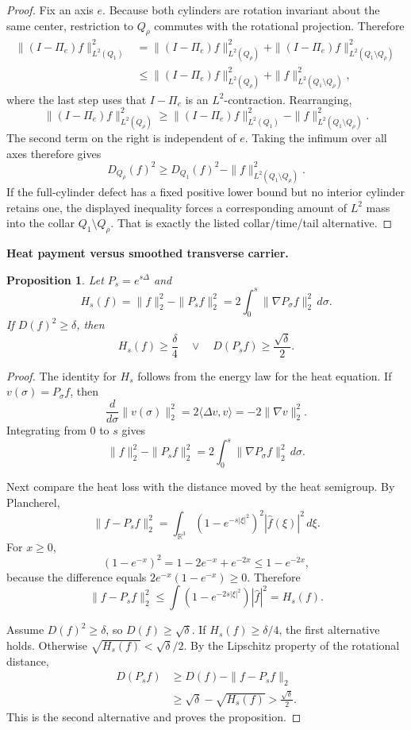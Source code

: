 \documentclass[11pt]{article}
\newtheorem{proposition}[theorem]{Proposition}
\theoremstyle{definition}\newtheorem{problem}[theorem]{Problem}
\theoremstyle{definition}
\theoremstyle{remark}
\newcommand{\R}{\mathbb R}
\begin{document}
\begin{proof}
Fix an axis \(e\).  Because both cylinders are rotation invariant about the
same center, restriction to \(Q_\rho\) commutes with the rotational projection.
Therefore
\[
\begin{aligned}
 \|(I-\Pi_e)f\|_{L^2(Q_1)}^2
 &=\|(I-\Pi_e)f\|_{L^2(Q_\rho)}^2
  +\|(I-\Pi_e)f\|_{L^2(Q_1\setminus Q_\rho)}^2\\
 &\le \|(I-\Pi_e)f\|_{L^2(Q_\rho)}^2
  +\|f\|_{L^2(Q_1\setminus Q_\rho)}^2,
\end{aligned}
\]
where the last step uses that \(I-\Pi_e\) is an \(L^2\)-contraction.  Rearranging,
\[
 \|(I-\Pi_e)f\|_{L^2(Q_\rho)}^2
 \ge
 \|(I-\Pi_e)f\|_{L^2(Q_1)}^2
 -\|f\|_{L^2(Q_1\setminus Q_\rho)}^2.
\]
The second term on the right is independent of \(e\).  Taking the infimum over
all axes therefore gives
\[
 D_{Q_\rho}(f)^2
 \ge D_{Q_1}(f)^2
 -\|f\|_{L^2(Q_1\setminus Q_\rho)}^2.
\]
If the full-cylinder defect has a fixed positive lower bound but no interior
cylinder retains one, the displayed inequality forces a corresponding amount
of \(L^2\) mass into the collar \(Q_1\setminus Q_\rho\).  That is exactly the
listed collar/time/tail alternative.
\end{proof}

\medskip
\noindent\textbf{Heat payment versus smoothed transverse carrier.}
\begin{proposition}
Let $P_s=e^{s\Delta}$ and
\[
 H_s(f)=\|f\|_2^2-\|P_sf\|_2^2
 =2\int_0^s\|\nabla P_\sigma f\|_2^2\,d\sigma.
\]
If $D(f)^2\ge\delta$, then
\[
 \boxed{
 H_s(f)\ge\frac\delta4
 \quad\vee\quad
 D(P_sf)\ge\frac{\sqrt\delta}{2}.
 }
\]
\end{proposition}

\begin{proof}
The identity for \(H_s\) follows from the energy law for the heat equation.  If
\(v(\sigma)=P_\sigma f\), then
\[
 \frac{d}{d\sigma}\|v(\sigma)\|_2^2
 =2\langle\Delta v,v\rangle
 =-2\|\nabla v\|_2^2.
\]
Integrating from \(0\) to \(s\) gives
\[
 \|f\|_2^2-\|P_sf\|_2^2
 =2\int_0^s\|\nabla P_\sigma f\|_2^2\,d\sigma.
\]

Next compare the heat loss with the distance moved by the heat semigroup.  By
Plancherel,
\[
 \|f-P_sf\|_2^2
 =\int_{\R^3}(1-e^{-s|\xi|^2})^2|\widehat f(\xi)|^2\,d\xi.
\]
For \(x\ge0\),
\[
 (1-e^{-x})^2
 =1-2e^{-x}+e^{-2x}
 \le1-e^{-2x},
\]
because the difference equals \(2e^{-x}(1-e^{-x})\ge0\).  Therefore
\[
 \|f-P_sf\|_2^2
 \le
 \int(1-e^{-2s|\xi|^2})|\widehat f|^2
 =H_s(f).
\]

Assume \(D(f)^2\ge\delta\), so \(D(f)\ge\sqrt\delta\).  If
\(H_s(f)\ge\delta/4\), the first alternative holds.  Otherwise
\(\sqrt{H_s(f)}<\sqrt\delta/2\).  By the Lipschitz property of the rotational
distance,
\[
\begin{aligned}
 D(P_sf)
 &\ge D(f)-\|f-P_sf\|_2\\
 &\ge \sqrt\delta-\sqrt{H_s(f)}
 >\frac{\sqrt\delta}{2}.
\end{aligned}
\]
This is the second alternative and proves the proposition.
\end{proof}
\end{document}
